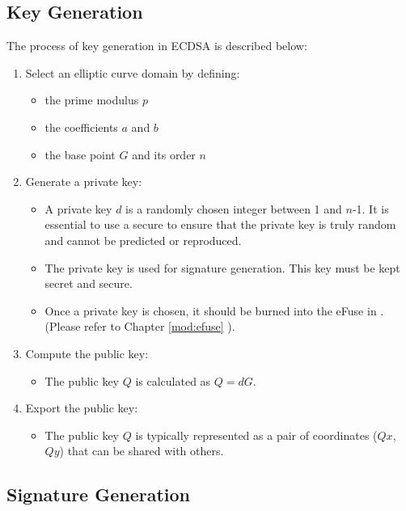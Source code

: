 \documentclass[main\_\_EN.tex]{subfiles}
\begin{document}
\subsection{Key Generation}

The process of key generation in ECDSA is described below:

\begin{enumerate}
    \item Select an elliptic curve domain by defining:
    \begin{itemize}
        \item the prime modulus $p$
        \item the coefficients $a$ and $b$
        \item the base point $G$ and its order $n$
    \end{itemize}
    \item Generate a private key:
    \begin{itemize}
        \item A private key $d$ is a randomly chosen integer between 1 and $n$-1. It is essential to use a secure \textit{} to ensure that the private key is truly random and cannot be predicted or reproduced.
        \item The private key is used for signature generation. This key must be kept secret and secure.
        \item Once a private key is chosen, it should be burned into the eFuse in \chipname{}. (Please refer to Chapter \ref{mod:efuse} \textit{}).
    \end{itemize}
    \item Compute the public key:
    \begin{itemize}
        \item The public key $Q$ is calculated as $Q = dG$.
    \end{itemize}
    \item Export the public key:
    \begin{itemize}
        \item The public key $Q$ is typically represented as a pair of coordinates ($Qx$, $Qy$) that can be shared with others.
    \end{itemize}
\end{enumerate}

\subsection{Signature Generation}
\end{document}
